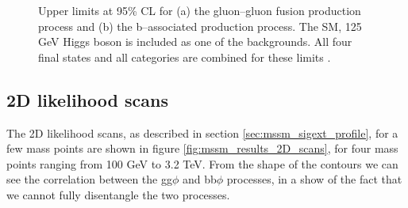 \begin{figure}[h!]
\begin{center}
\end{center}
\caption{Upper limits at 95\% CL for (a) the gluon--gluon fusion production
process and (b) the b--associated production process. The SM, 125 GeV Higgs boson
is included as one of the backgrounds. All four final states and 
all categories are combined for these limits \cite{CMS-PAS-HIG-16-037-addit}.}
\label{fig:mssm_results_greenband}
\end{figure}


\subsection{2D likelihood scans}
\label{sec:mssm_results_2D}
The 2D likelihood scans, as described in section \ref{sec:mssm_sigext_profile}, for
a few mass points are shown in figure \ref{fig:mssm_results_2D_scans},
for four mass points ranging from 100 GeV to 3.2 TeV. From the shape of the contours
we can see the correlation between the gg$\phi$ and bb$\phi$ processes, in a show of
the fact that we cannot fully disentangle the two processes.

